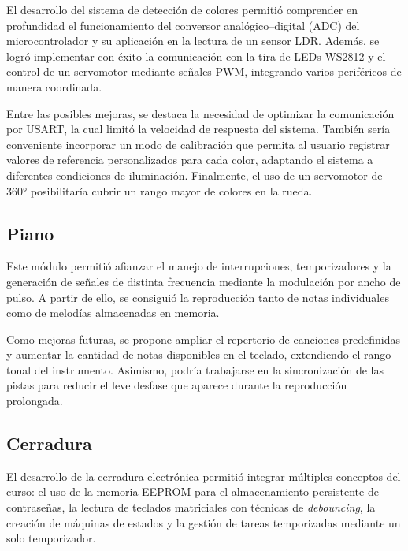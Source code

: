 El desarrollo del sistema de detección de colores permitió comprender en profundidad el funcionamiento del conversor analógico–digital (ADC) del microcontrolador y su aplicación en la lectura de un sensor LDR. Además, se logró implementar con éxito la comunicación con la tira de LEDs WS2812 y el control de un servomotor mediante señales PWM, integrando varios periféricos de manera coordinada.  

\vspace{1em}

Entre las posibles mejoras, se destaca la necesidad de optimizar la comunicación por USART, la cual limitó la velocidad de respuesta del sistema. También sería conveniente incorporar un modo de calibración que permita al usuario registrar valores de referencia personalizados para cada color, adaptando el sistema a diferentes condiciones de iluminación. Finalmente, el uso de un servomotor de 360° posibilitaría cubrir un rango mayor de colores en la rueda.

\subsection{Piano}

Este módulo permitió afianzar el manejo de interrupciones, temporizadores y la generación de señales de distinta frecuencia mediante la modulación por ancho de pulso. A partir de ello, se consiguió la reproducción tanto de notas individuales como de melodías almacenadas en memoria.  

\vspace{1em}

Como mejoras futuras, se propone ampliar el repertorio de canciones predefinidas y aumentar la cantidad de notas disponibles en el teclado, extendiendo el rango tonal del instrumento. Asimismo, podría trabajarse en la sincronización de las pistas para reducir el leve desfase que aparece durante la reproducción prolongada.

\subsection{Cerradura}

El desarrollo de la cerradura electrónica permitió integrar múltiples conceptos del curso: el uso de la memoria EEPROM para el almacenamiento persistente de contraseñas, la lectura de teclados matriciales con técnicas de \textit{debouncing}, la creación de máquinas de estados y la gestión de tareas temporizadas mediante un solo temporizador.  

